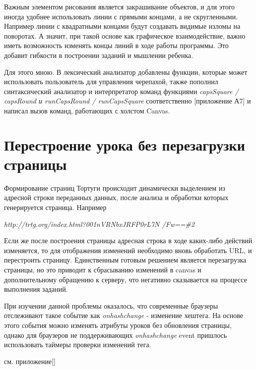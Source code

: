 Важным элементом рисования является закрашивание объектов, и для этого иногда удобнее использовать линии с прямыми концами, а не скругленными. Например линии с квадратными концами будут создавать видимые изломы на поворотах. А значит, при такой основе как графическое взаимодействие, важно иметь возможность  изменять  концы линий в ходе работы программы. Это добавит гибкости в построении заданий и мышлении ребенка.


Для этого мною. В лексический анализатор  добавлены функции, которые может использовать пользователь для управления черепахой, также пополнил синтаксический анализатор и интерпретатор команд функциями \textit{capsSquare / capsRound и runCapsRound / runCapsSquare} соответственно [приложение А7] и написал вызов команд, работающих с холстом Canvas.

\section{Перестроение урока без перезагрузки страницы} \label{sect1_1}


Формирование страниц Тортуги происходит динамически выделением из адресной строки переданных данных, после анализа и обработки которых генерируется страница.
Например 
 
 \begin{center}
 \vspace{6mm}
  \textit{ http://trtg.org/index.html?001nVRNbxJRFP0rL7N /Fw==\#2 }
 \end{center} 
 \vspace{6mm}
 
Если же после построения страницы адресная строка в ходе каких-либо действий изменяется, то для отображения изменений необходимо вновь обработать URL, и  перестроить страницу. Единственным готовым решением является  перезагрузка страницы, но это приводит к сбрасыванию изменений в canvas и дополнительному обращению к серверу, что негативно сказывается на процессе выполнения заданий. 

При изучении данной проблемы оказалось, что современные браузеры отслеживают такое событие как  \textit{onhashchange} - изменение хештега. На основе этого события  можно изменять атрибуты уроков без  обновления страницы, однако для браузеров не поддерживающих \textit{onhashchange} event пришлось использовать таймеры проверки изменений тега.

см. приложение[]

